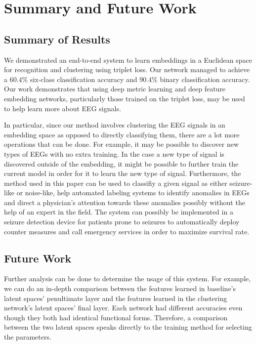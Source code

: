 \chapter{Summary and Future Work}

\section*{Summary of Results}
We demonstrated an end-to-end system to learn embeddings in a Euclidean space for recognition and clustering using triplet loss. Our network managed to achieve a $60.4\%$ six-class classification accuracy and 90.4\% binary classification accuracy. Our work demonstrates that using deep metric learning and deep feature embedding networks, particularly those trained on the triplet loss, may be used to help learn more about EEG signals. 

In particular, since our method involves clustering the EEG signals in an embedding space as opposed to directly classifying them, there are a lot more operations that can be done. For example, it may be possible to discover new types of EEGs with no extra training. In the case a new type of signal is discovered outside of the embedding, it might be possible to further train the current model in order for it to learn the new type of signal. Furthermore, the method used in this paper can be used to classifiy a given signal as either seizure-like or noise-like, help automated labeling systems to identify anomalies in EEGs and direct a physician's attention towards these anomalies possibly without the help of an expert in the field. The system can possibly be implemented in a seizure detection device for patients prone to seizures to automatically deploy counter measures and call emergency services in order to maximize survival rate.

\section*{Future Work}

Further analysis can be done to determine the usage of this system. For example, we can do an in-depth comparison between the features learned in baseline's latent spaces' penultimate layer and the features learned in the clustering network's latent spaces' final layer. Each network had different accuracies even though they both had identical functional forms. Therefore, a comparison between the two latent spaces speaks directly to the training method for selecting the parameters. 

